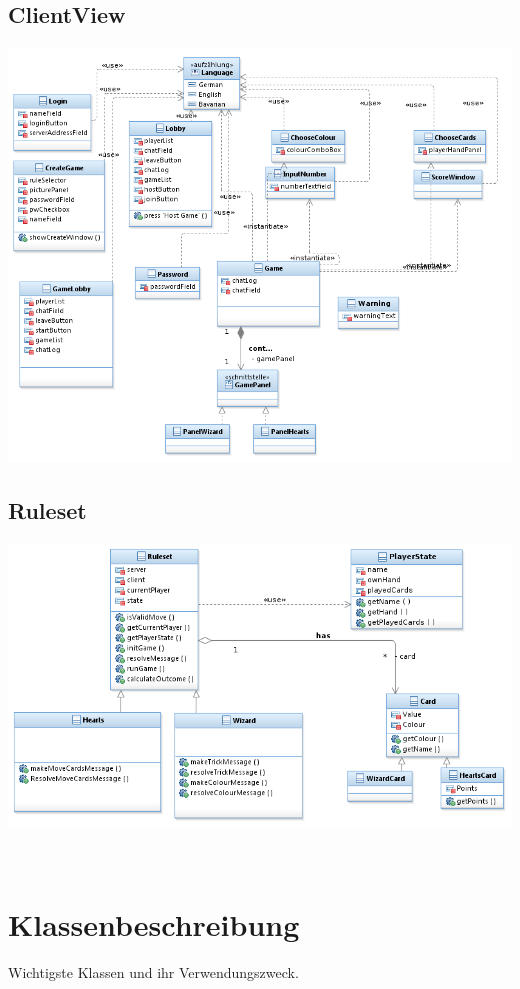 \documentclass{article}
\begin{document}
\subsection{ClientView}
\includegraphics[width=\textwidth]{ClientView}
\subsection{Ruleset}
\includegraphics[width=\textwidth]{Ruleset}

\ \\
\section{Klassenbeschreibung}
Wichtigste Klassen und ihr Verwendungszweck.
\end{document}
